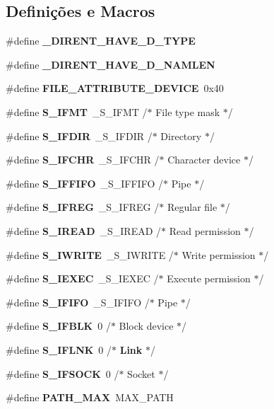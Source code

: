 \subsection*{Definições e Macros}
\begin{DoxyCompactItemize}
\item 
\#define {\bf \+\_\+\+D\+I\+R\+E\+N\+T\+\_\+\+H\+A\+V\+E\+\_\+\+D\+\_\+\+T\+Y\+PE}
\item 
\#define {\bf \+\_\+\+D\+I\+R\+E\+N\+T\+\_\+\+H\+A\+V\+E\+\_\+\+D\+\_\+\+N\+A\+M\+L\+EN}
\item 
\#define {\bf F\+I\+L\+E\+\_\+\+A\+T\+T\+R\+I\+B\+U\+T\+E\+\_\+\+D\+E\+V\+I\+CE}~0x40
\item 
\#define {\bf S\+\_\+\+I\+F\+MT}~\+\_\+\+S\+\_\+\+I\+F\+MT                     /$\ast$ File type mask $\ast$/
\item 
\#define {\bf S\+\_\+\+I\+F\+D\+IR}~\+\_\+\+S\+\_\+\+I\+F\+D\+IR                    /$\ast$ Directory $\ast$/
\item 
\#define {\bf S\+\_\+\+I\+F\+C\+HR}~\+\_\+\+S\+\_\+\+I\+F\+C\+HR                    /$\ast$ Character device $\ast$/
\item 
\#define {\bf S\+\_\+\+I\+F\+F\+I\+FO}~\+\_\+\+S\+\_\+\+I\+F\+F\+I\+FO                   /$\ast$ Pipe $\ast$/
\item 
\#define {\bf S\+\_\+\+I\+F\+R\+EG}~\+\_\+\+S\+\_\+\+I\+F\+R\+EG                    /$\ast$ Regular file $\ast$/
\item 
\#define {\bf S\+\_\+\+I\+R\+E\+AD}~\+\_\+\+S\+\_\+\+I\+R\+E\+AD                    /$\ast$ Read permission $\ast$/
\item 
\#define {\bf S\+\_\+\+I\+W\+R\+I\+TE}~\+\_\+\+S\+\_\+\+I\+W\+R\+I\+TE                   /$\ast$ Write permission $\ast$/
\item 
\#define {\bf S\+\_\+\+I\+E\+X\+EC}~\+\_\+\+S\+\_\+\+I\+E\+X\+EC                    /$\ast$ Execute permission $\ast$/
\item 
\#define {\bf S\+\_\+\+I\+F\+I\+FO}~\+\_\+\+S\+\_\+\+I\+F\+I\+FO                     /$\ast$ Pipe $\ast$/
\item 
\#define {\bf S\+\_\+\+I\+F\+B\+LK}~0                          /$\ast$ Block device $\ast$/
\item 
\#define {\bf S\+\_\+\+I\+F\+L\+NK}~0                          /$\ast$ {\bf Link} $\ast$/
\item 
\#define {\bf S\+\_\+\+I\+F\+S\+O\+CK}~0                          /$\ast$ Socket $\ast$/
\item 
\#define {\bf P\+A\+T\+H\+\_\+\+M\+AX}~M\+A\+X\+\_\+\+P\+A\+TH

\end{DoxyCompactItemize}

